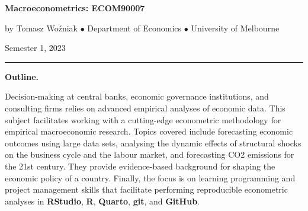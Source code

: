 \documentclass[10pt]{article}
\begin{document}


\bigskip\noindent\textbf{\LARGE Macroeconometrics: ECOM90007}

\smallskip\noindent by Tomasz Wo\'zniak $\bullet$ Department of Economics $\bullet$  University of Melbourne

\smallskip\noindent Semester 1, 2023

\smallskip\noindent\rule{5cm}{.1pt}

\normalsize
\smallskip\noindent\textbf{Outline.} 

\noindent Decision-making at central banks, economic governance institutions, and consulting firms relies on advanced empirical analyses of economic data. This subject facilitates working with a cutting-edge econometric methodology for empirical macroeconomic research. Topics covered include forecasting economic outcomes using large data sets, analysing the dynamic effects of structural shocks on the business cycle and the labour market, and forecasting CO2 emissions for the 21st century. They provide evidence-based background for shaping the economic policy of a country. Finally, the focus is on learning programming and project management skills that facilitate performing reproducible econometric analyses in \textbf{RStudio}, \textbf{R}, \textbf{Quarto}, \textbf{git}, and \textbf{GitHub}.
\end{document}
